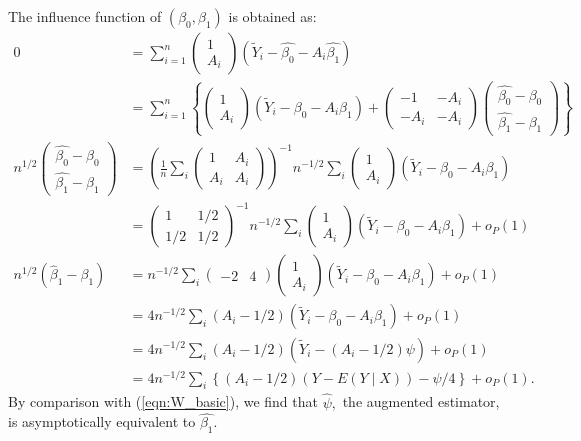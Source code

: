 \message{ !name(manuscript.tex)}\documentclass[10pt,a4paper]{amsart}
\newcommand{\EE}{E}
\begin{document}
The influence function of $(\beta_0,\beta_1)$ is obtained as:
\begin{align*}
  0 &= \sum_{i=1}^n\begin{pmatrix}1\\A_i\end{pmatrix}(\tilde{Y}_i - \hat{\beta_0} - A_i\hat{\beta_1})\\
    &= \sum_{i=1}^n\left\{\begin{pmatrix}1\\A_i\end{pmatrix}(\tilde{Y}_i - \beta_0 - A_i\beta_1) +
  \begin{pmatrix}-1&-A_i\\-A_i&-A_i\end{pmatrix}\begin{pmatrix}\hat{\beta_0}-\beta_0\\ \hat{\beta_1}-\beta_1\end{pmatrix}\right\}\\
  n^{1/2}\begin{pmatrix}\hat{\beta_0}-\beta_0\\ \hat{\beta_1}-\beta_1\end{pmatrix} &=\left(\frac{1}{n}\sum_i\begin{pmatrix}1&A_i\\A_i&A_i\end{pmatrix}\right)^{-1}n^{-1/2}\sum_i \begin{pmatrix}1\\A_i\end{pmatrix}(\tilde{Y}_i - \beta_0 - A_i\beta_1)\\
    &=\begin{pmatrix}1&1/2\\1/2&1/2\end{pmatrix}^{-1}n^{-1/2}\sum_i \begin{pmatrix}1\\A_i\end{pmatrix}(\tilde{Y}_i - \beta_0 - A_i\beta_1)+o_P(1)\\
  n^{1/2}(\hat{\beta}_1 - \beta_1) &= n^{-1/2}\sum_i \begin{pmatrix}-2 & 4\end{pmatrix}\begin{pmatrix}1\\A_i\end{pmatrix}(\tilde{Y}_i - \beta_0 - A_i\beta_1) + o_P(1)\\
    &= 4n^{-1/2}\sum_i (A_i-1/2)(\tilde{Y}_i - \beta_0 - A_i\beta_1) + o_P(1)\\
    &= 4n^{-1/2}\sum_i (A_i-1/2)(\tilde{Y}_i - (A_i - 1/2)\psi) + o_P(1)\\
    &= 4n^{-1/2}\sum_i \left\{(A_i-1/2)(Y-\EE(Y\mid X)) - \psi/4\right\} + o_P(1).
\end{align*}
By comparison with (\ref{eqn:W_basic}), we find that $\hat{\psi},$ the
augmented estimator, is asymptotically equivalent to $\hat{\beta_1}.$
\end{document}

